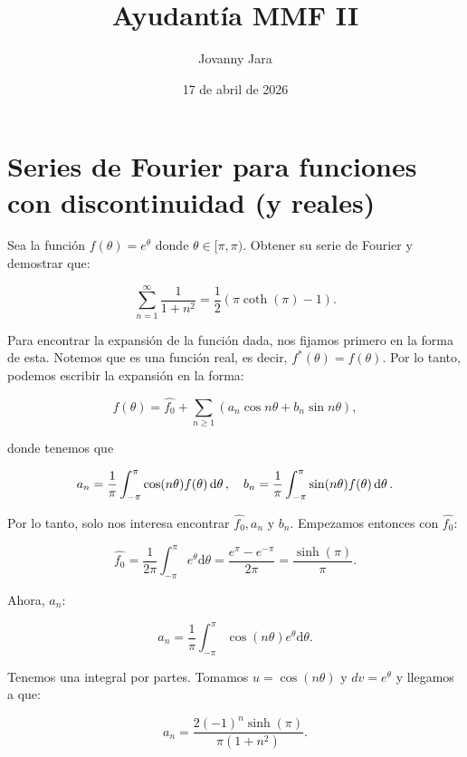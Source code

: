 \documentclass[11pt]{article}
\title{Ayudantía MMF II}
\author{Jovanny Jara}
\date{17 de abril de 2026}
\begin{document}
\maketitle

\section{Series de Fourier para funciones con discontinuidad (y reales)}

Sea la función $f(\theta) = e^\theta$ donde $\theta \in [\pi, \pi)$. Obtener su serie de Fourier y demostrar que:

\begin{equation*}
    \sum_{\mathit{n}=1}^{\infty} \frac{1}{1+\mathit{n}^2} = \frac{1}{2} (\pi\coth(\pi)-1).
\end{equation*}

Para encontrar la expansión de la función dada, nos fijamos primero en la forma de esta. Notemos que es una función real, es decir, $f^*(\theta) = f(\theta)$. Por lo tanto, podemos escribir la expansión en la forma:

\begin{equation}
    f(\theta) = \hat{f_0} + \sum_{n\geq1} (a_n\cos{n\theta} + b_n\sin{n\theta}),
\end{equation}

donde tenemos que

\begin{equation}
    a_n = \frac{1}{\pi}\int_{-\pi}^\pi \cos(n\theta) f(\theta) \dd{\theta}\qc b_n = \frac{1}{\pi}\int_{-\pi}^\pi \sin(n\theta) f(\theta) \dd{\theta}.
\end{equation}

Por lo tanto, solo nos interesa encontrar $\hat{f_0}, a_n$ y $b_n$. Empezamos entonces con $\hat{f_0}$:

\begin{equation}
    \hat{f_0} = \frac{1}{2\pi}\int_{-\pi}^\pi e^\theta \mathrm{d}\theta = \frac{e^\pi - e^{-\pi}}{2\pi} = \frac{\sinh(\pi)}{\pi}.
\end{equation}

Ahora, $a_n$:

\begin{equation}
    a_n = \frac{1}{\pi}\int_{-\pi}^\pi \cos(n\theta) e^\theta \mathrm{d}\theta.
\end{equation}

Tenemos una integral por partes. Tomamos $u=\cos(n\theta)$ y $dv=e^\theta$ y llegamos a que:

\begin{equation}
    a_n = \frac{2(-1)^n\sinh(\pi)}{\pi(1 + n^2)}.
\end{equation}
\end{document}
